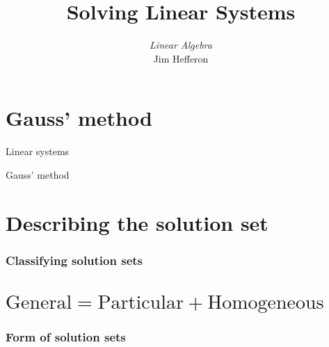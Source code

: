 \documentclass[10pt,t,serif,professionalfont]{beamer}
\title[Solving Linear Systems] %
{Solving Linear Systems}
\author{\textit{Linear Algebra} \\ {\small Jim Hef{}feron}}
\institute{
  \texttt{http://joshua.smcvt.edu/linearalgebra}
}
\date{}
\begin{document}
\begin{frame}
  \titlepage
\end{frame}




\section{Gauss' method}
\begin{frame}{Linear systems} 
\end{frame}


\begin{frame}
  
\end{frame}



\begin{frame}{Gauss' method}
\thm
{}

\end{frame}



\begin{frame}
\pf
{}

\end{frame}








\section{Describing the solution set}
\begin{frame}
\frametitle{Classifying solution sets} 

\end{frame}



\section{$\text{General}=\text{Particular}+\text{Homogeneous}$}
\begin{frame}
\frametitle{Form of solution sets} 

\end{frame}








% 
\end{document}
